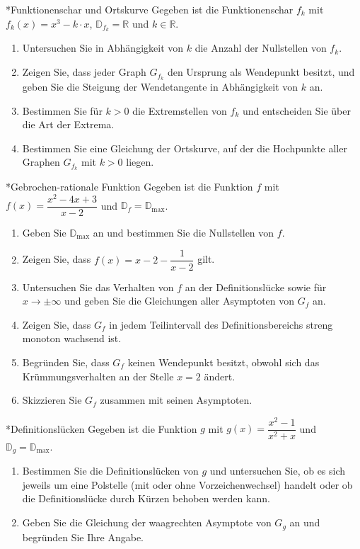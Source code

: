 
\begin{uebung}*{Funktionenschar und Ortskurve}
Gegeben ist die Funktionenschar $f_k$ mit $f_k(x) = x^3-k\cdot x$, $\mathds{D}_{f_k} = \mathds{R}$ und $k\in\mathds{R}$.
\begin{enumerate}[label=\alph*)]
  \item Untersuchen Sie in Abhängigkeit von $k$ die Anzahl der Nullstellen von $f_k$.
  \item Zeigen Sie, dass jeder Graph $G_{f_k}$ den Ursprung als Wendepunkt besitzt, und geben Sie die Steigung der Wendetangente in Abhängigkeit von $k$ an.
  \item Bestimmen Sie für $k>0$ die Extremstellen von $f_k$ und entscheiden Sie über die Art der Extrema.
  \item Bestimmen Sie eine Gleichung der Ortskurve, auf der die Hochpunkte aller Graphen $G_{f_k}$ mit $k>0$ liegen.
\end{enumerate}
\end{uebung}


\begin{uebung}*{Gebrochen-rationale Funktion}
Gegeben ist die Funktion $f$ mit $f(x) = \dfrac{x^2-4x+3}{x-2}$ und $\mathds{D}_f = \mathds{D}_{\text{max}}$.
\begin{enumerate}[label=\alph*)]
  \item Geben Sie $\mathds{D}_{\text{max}}$ an und bestimmen Sie die Nullstellen von $f$.
  \item Zeigen Sie, dass $f(x) = x-2-\dfrac{1}{x-2}$ gilt.
  \item Untersuchen Sie das Verhalten von $f$ an der Definitionslücke sowie für $x\longrightarrow\pm\infty$ und geben Sie die Gleichungen aller Asymptoten von $G_f$ an.
  \item Zeigen Sie, dass $G_f$ in jedem Teilintervall des Definitionsbereichs streng monoton wachsend ist.
  \item Begründen Sie, dass $G_f$ keinen Wendepunkt besitzt, obwohl sich das Krümmungsverhalten an der Stelle $x=2$ ändert.
  \item Skizzieren Sie $G_f$ zusammen mit seinen Asymptoten.
\end{enumerate}
\end{uebung}

\begin{uebung}*{Definitionslücken}
Gegeben ist die Funktion $g$ mit $g(x) = \dfrac{x^2-1}{x^2+x}$ und $\mathds{D}_g = \mathds{D}_{\text{max}}$.
\begin{enumerate}[label=\alph*)]
  \item Bestimmen Sie die Definitionslücken von $g$ und untersuchen Sie, ob es sich jeweils um eine Polstelle (mit oder ohne Vorzeichenwechsel) handelt oder ob die Definitionslücke durch Kürzen behoben werden kann.
  \item Geben Sie die Gleichung der waagrechten Asymptote von $G_g$ an und begründen Sie Ihre Angabe.
\end{enumerate}
\end{uebung}

